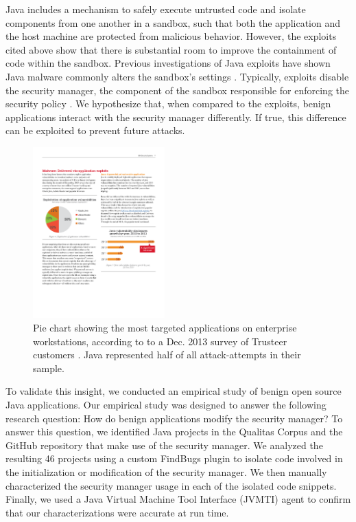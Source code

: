 \documentclass{sig-alternate}
\begin{document}
Java includes a mechanism to safely execute untrusted code and isolate
components from one another in a sandbox, such that both the application
and the host machine are protected from malicious behavior. However,
the exploits cited above show that there is substantial room to improve
the containment of code within the sandbox. Previous investigations
of Java exploits have shown Java malware commonly alters the sandbox's
settings \cite{garber_2012}. Typically, exploits disable the security
manager, the component of the sandbox responsible for enforcing the
security policy \cite{fireeye_2013,svoboda_anatomy_blog_2013,security_explorations_2012,blackhat_2012}.
We hypothesize that, when compared to the exploits, benign applications
interact with the security manager differently. If true, this difference
can be exploited to prevent future attacks.

\begin{figure}
\begin{centering}
\includegraphics[width=2in]{most_targeted_apps_ibm_xforce}
\par\end{centering}

\caption{Pie chart showing the most
targeted applications on enterprise workstations, according to to
a Dec. 2013 survey of Trusteer customers \cite{xforceQ12013}. Java
represented half of all attack-attempts in their sample.}
\label{fig:most-targeted-applications}
\end{figure}


To validate this insight, we conducted an empirical study of benign
open source Java applications. Our empirical study was designed to
answer the following research question: How do benign applications
modify the security manager? To answer this question, we identified
Java projects in the Qualitas Corpus \cite{QualitasCorpus:APSEC:2010}
and the GitHub repository that make use of the security manager. We
analyzed the resulting 46 projects using a custom FindBugs \cite{hovemeyer_finding_2004}
plugin to isolate code involved in the initialization or modification
of the security manager. We then manually characterized the security
manager usage in each of the isolated code snippets. Finally, we used
a Java Virtual Machine Tool Interface (JVMTI) agent to confirm that
our characterizations were accurate at run time. 
\end{document}
